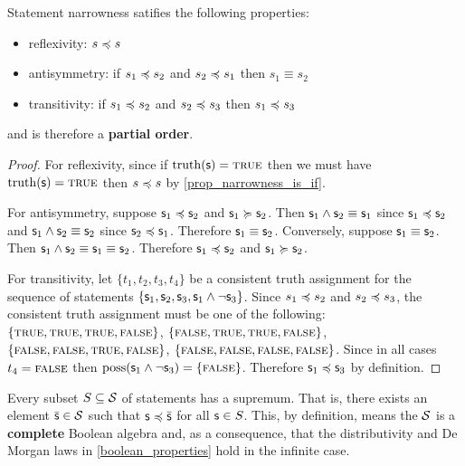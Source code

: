 \documentclass[11pt,letterpaper,fleqn]{memoir} %
\begin{document}
\begin{mathSection}
\begin{prop}
	Statement narrowness satifies the following properties:
	\begin{itemize}
		\item reflexivity: $s \preccurlyeq s$
		\item antisymmetry: if $s_1 \preccurlyeq s_2$ and  $s_2 \preccurlyeq s_1$ then $s_1 \equiv s_2$
		\item transitivity: if $s_1 \preccurlyeq s_2$ and $s_2 \preccurlyeq s_3$ then $s_1 \preccurlyeq s_3$
	\end{itemize}
	and is therefore a \textbf{partial order}.
\end{prop}
\begin{proof}
	For reflexivity, since if $\operatorname{truth}(\mathsf{s}) = \textsc{true}$ then we must have $\operatorname{truth}(\mathsf{s}) = \textsc{true}$ then $s \preccurlyeq s$ by \eqref{prop_narrowness_is_if}.
	
	For antisymmetry, suppose $\mathsf{s}_1 \preccurlyeq \mathsf{s}_2$ and $\mathsf{s}_1 \succcurlyeq \mathsf{s}_2$. Then $\mathsf{s}_1 \wedge \mathsf{s}_2 \equiv \mathsf{s}_1$ since $\mathsf{s}_1 \preccurlyeq \mathsf{s}_2$ and $\mathsf{s}_1 \wedge \mathsf{s}_2 \equiv \mathsf{s}_2$ since $\mathsf{s}_2 \preccurlyeq \mathsf{s}_1$. Therefore $\mathsf{s}_1 \equiv \mathsf{s}_2$. Conversely, suppose $\mathsf{s}_1 \equiv \mathsf{s}_2$. Then $\mathsf{s}_1 \wedge \mathsf{s}_2 \equiv \mathsf{s}_1 \equiv \mathsf{s}_2$. Therefore $\mathsf{s}_1 \preccurlyeq \mathsf{s}_2$ and $\mathsf{s}_1 \succcurlyeq \mathsf{s}_2$.
	
	For transitivity, let $\{t_1, t_2, t_3, t_4\}$ be a consistent truth assignment for the sequence of statements $\{\mathsf{s}_1, \mathsf{s}_2, \mathsf{s}_3, \mathsf{s}_1 \wedge \neg\mathsf{s}_3\}$.  Since $s_1 \preccurlyeq s_2$ and $s_2 \preccurlyeq s_3$, the consistent truth assignment must be one of the following: $\{\textsc{true}, \textsc{true}, \textsc{true}, \textsc{false}\}$, $\{\textsc{false}, \textsc{true}, \textsc{true}, \textsc{false}\}$, $\{\textsc{false}, \textsc{false}, \textsc{true}, \textsc{false}\}$, $\{\textsc{false}, \textsc{false}, \textsc{false}, \textsc{false}\}$.
	Since in all cases $t_4=\textsc{false}$ then $\operatorname{poss}(\mathsf{s}_1 \wedge \neg\mathsf{s}_3) = \{\textsc{false}\}$. Therefore $\mathsf{s}_1 \preccurlyeq \mathsf{s}_3$ by definition.
\end{proof}

\begin{prop}
	Every subset $S \subseteq \mathcal{S}$ of statements has a supremum. That is, there exists an element $\bar{\mathsf{s}} \in \mathcal{S}$ such that $\mathsf{s} \preccurlyeq \bar{\mathsf{s}}$ for all $\mathsf{s} \in S$. This, by definition, means the $\mathcal{S}$ is a \textbf{complete} Boolean algebra and, as a consequence, that the distributivity and De Morgan laws in \ref{boolean_properties} hold in the infinite case.
\end{prop}


\end{mathSection}
\end{document}
